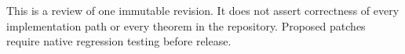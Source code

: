 \documentclass[11pt,a4paper]{article}
\theoremstyle{remark}\newtheorem{remark}[proposition]{Remark}
\begin{document}
\vfill
{\small\color{muted}This is a review of one immutable revision. It does not assert correctness of every implementation path or every theorem in the repository. Proposed patches require native regression testing before release.}
\clearpage
\begingroup
\small
\setlength{\parskip}{0pt}
\tableofcontents
\endgroup
\clearpage










\clearpage
\appendix


\end{document}
